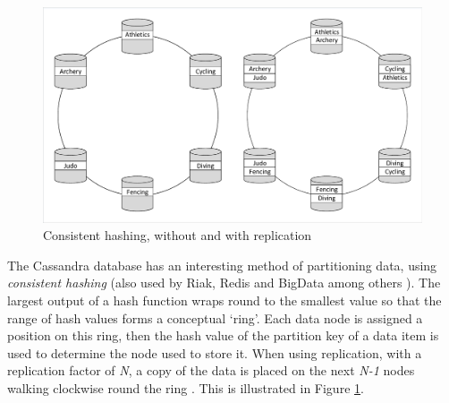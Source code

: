 \begin{figure}
	\caption{Consistent hashing, without and with replication}
	\label{figure:consistent_hashing}
	\centering
	\includegraphics[trim = 5 5 5 5, clip, width=\textwidth]{img/dbdist}
\end{figure}
\FloatBarrier
The Cassandra database has an interesting method of partitioning data, using {\itshape consistent hashing} (also used by Riak, Redis and BigData among others \cite{RN66}).  The largest output of a hash function wraps round to the smallest value so that the range of hash values forms a conceptual `ring'.  Each data node is assigned a position on this ring, then the hash value of the partition key of a data item is used to determine the node used to store it.  When using replication, with a replication factor of {\itshape N}, a copy of the data is placed on the next {\itshape N-1} nodes walking clockwise round the ring \cite{RN1050}.  This is illustrated in Figure \ref{figure:consistent_hashing}.


